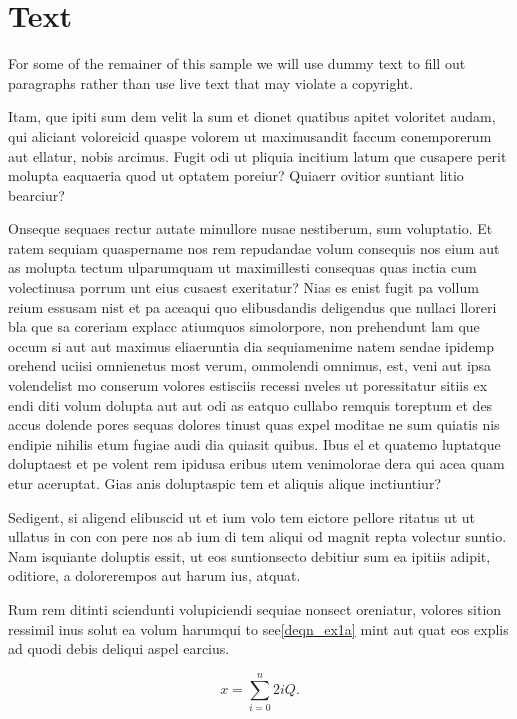 \documentclass[lettersize,journal]{IEEEtran}
\begin{document}
\section{Text}
For some of the remainer of this sample we will use dummy text to fill out paragraphs rather than use live text that may violate a copyright.

Itam, que ipiti sum dem velit la sum et dionet quatibus apitet voloritet audam, qui aliciant voloreicid quaspe volorem ut maximusandit faccum conemporerum aut ellatur, nobis arcimus.
Fugit odi ut pliquia incitium latum que cusapere perit molupta eaquaeria quod ut optatem poreiur? Quiaerr ovitior suntiant litio bearciur?

Onseque sequaes rectur autate minullore nusae nestiberum, sum voluptatio. Et ratem sequiam quaspername nos rem repudandae volum consequis nos eium aut as molupta tectum ulparumquam ut maximillesti consequas quas inctia cum volectinusa porrum unt eius cusaest exeritatur? Nias es enist fugit pa vollum reium essusam nist et pa aceaqui quo elibusdandis deligendus que nullaci lloreri bla que sa coreriam explacc atiumquos simolorpore, non prehendunt lam que occum\cite{ref6} si aut aut maximus eliaeruntia dia sequiamenime natem sendae ipidemp orehend uciisi omnienetus most verum, ommolendi omnimus, est, veni aut ipsa volendelist mo conserum volores estisciis recessi nveles ut poressitatur sitiis ex endi diti volum dolupta aut aut odi as eatquo cullabo remquis toreptum et des accus dolende pores sequas dolores tinust quas expel moditae ne sum quiatis nis endipie nihilis etum fugiae audi dia quiasit quibus.
\IEEEpubidadjcol
Ibus el et quatemo luptatque doluptaest et pe volent rem ipidusa eribus utem venimolorae dera qui acea quam etur aceruptat.
Gias anis doluptaspic tem et aliquis alique inctiuntiur?

Sedigent, si aligend elibuscid ut et ium volo tem eictore pellore ritatus ut ut ullatus in con con pere nos ab ium di tem aliqui od magnit repta volectur suntio. Nam isquiante doluptis essit, ut eos suntionsecto debitiur sum ea ipitiis adipit, oditiore, a dolorerempos aut harum ius, atquat.

Rum rem ditinti sciendunti volupiciendi sequiae nonsect oreniatur, volores sition ressimil inus solut ea volum harumqui to see\eqref{deqn_ex1a} mint aut quat eos explis ad quodi debis deliqui aspel earcius.

\begin{equation}
\label{deqn_ex1a}
x = \sum_{i=0}^{n} 2{i} Q.
\end{equation}
\end{document}
